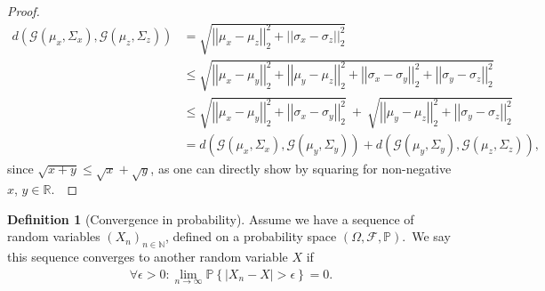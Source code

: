 \documentclass[12pt, a4paper]{article}
\numberwithin{equation}{section}
\theoremstyle{definition}
\theoremstyle{definition}
\newtheorem{defn}[thm]{Definition} %
\begin{document}
\begin{proof}
\begin{align}
			d\left(\mathcal G(\mu_{x}, \Sigma_{x}), \mathcal G(\mu_{z}, \Sigma_{z})\right) &= \sqrt{\left\vert\left\vert \mu_{x} - \mu_{z} \right\vert\right\vert_{2}^{2} + \left\vert\left\vert \sigma_{x} - \sigma_{z}\right\vert\right\vert_{2}^{2}} 
			\\ &\leq \sqrt{\left\vert\left\vert \mu_{x} - \mu_{y}\right\vert\right\vert_{2}^{2} + \left\vert\left\vert \mu_{y} - \mu_{z}\right\vert\right\vert_{2}^{2} + \left\vert\left\vert \sigma_{x} - \sigma_{y}\right\vert\right\vert_{2}^{2} + \left\vert\left\vert \sigma_{y} - \sigma_{z}\right\vert\right\vert_{2}^{2}} 
			\\ &\leq \sqrt{\left\vert\left\vert \mu_{x} - \mu_{y}\right\vert\right\vert_{2}^{2} + \left\vert\left\vert \sigma_{x} - \sigma_{y}\right\vert\right\vert_{2}^{2}} \ + \ \sqrt{\left\vert\left\vert \mu_{y} - \mu_{z}\right\vert\right\vert_{2}^{2} + \left\vert\left\vert \sigma_{y} - \sigma_{z}\right\vert\right\vert_{2}^{2}} 
			\\ &= d\left(\mathcal G(\mu_{x}, \Sigma_{x}), \mathcal G(\mu_{y}, \Sigma_{y})\right) + d\left(\mathcal G(\mu_{y}, \Sigma_{y}), \mathcal G(\mu_{z}, \Sigma_{z})\right), 
		\end{align}
		since $\sqrt{x+y} \leq \sqrt{x} + \sqrt{y}$, as one can directly show by squaring for non-negative $x$, $y\in\mathbb R$.\ 
	\end{proof}

	\begin{defn}[Convergence in probability]
		Assume we have a sequence of random variables $(X_{n})_{n\in \mathbb N}$, defined on a probability space $(\Omega, \mathcal F, \mathbb P)$.\ We say this sequence converges to another random variable $X$ if 
		\begin{align}
			\forall \epsilon > 0: \lim\limits_{n\rightarrow\infty}\mathbb P\left\{ \left\vert X_{n} - X\right\vert > \epsilon \right\} = 0. 
		\end{align}
	\end{defn}
	
	\newpage 
\end{document}
